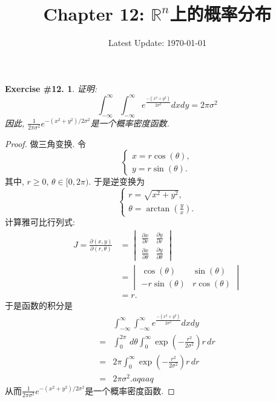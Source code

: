\documentclass[UTF8, a4paper]{article}
\title{Chapter 12: \(\mathbb{R}^n\)上的概率分布}
\author{}
\date{Latest Update: \today}
\newtheorem{exercise}{Exercise \#12.}
\begin{document}
\maketitle

\begin{framed}
\begin{exercise}
证明:
$$
\int_{-\infty}^{\infty} \int_{-\infty}^{\infty} e^{\frac{-\left(x^2+y^2\right)}{2 \sigma^2}} d x d y=2 \pi \sigma^2
$$
因此, $\frac{1}{2 \pi \sigma^2} e^{-\left(x^2+y^2\right) / 2 \sigma^2}$是一个概率密度函数.
\end{exercise}
\end{framed}

\begin{proof}
做三角变换.
令
$$
\begin{cases}
x = r\cos(\theta), \\
y = r\sin(\theta).
\end{cases}
$$
其中, \(r \geq 0\), \(\theta \in [0, 2\pi)\).
于是逆变换为
$$
\begin{cases}
r = \sqrt{x^2+y^2}, \\
\theta = \arctan\left(\frac{y}{x}\right).
\end{cases}
$$
计算雅可比行列式:
$$
\begin{aligned}
J = \frac{\partial(x,y)}{\partial(r,\theta)} &= \begin{vmatrix}
\frac{\partial x}{\partial r} & \frac{\partial y}{\partial r} \\
\frac{\partial x}{\partial \theta} & \frac{\partial y}{\partial \theta}
\end{vmatrix} \\
&= \begin{vmatrix}
\cos(\theta) & \sin(\theta) \\
-r\sin(\theta) & r\cos(\theta)
\end{vmatrix} \\
&= r.
\end{aligned}
$$
于是函数的积分是
$$
\begin{aligned}
    &\int_{-\infty}^{\infty} \int_{-\infty}^{\infty} e^{\frac{-\left(x^2+y^2\right)}{2 \sigma^2}} d x d y \\
    =& \int_{0}^{2\pi} \,d\theta \int_{0}^{\infty} \exp\left(-\frac{r^2}{2\sigma^2}\right) r \,dr \\
    =& 2\pi \int_{0}^{\infty} \exp\left(-\frac{r^2}{2\sigma^2}\right) r \,dr \\
    =& 2\pi \sigma^2.aqaaq
\end{aligned}
$$
从而$\frac{1}{2 \pi \sigma^2} e^{-\left(x^2+y^2\right) / 2 \sigma^2}$是一个概率密度函数.
\end{proof}
\end{document}
